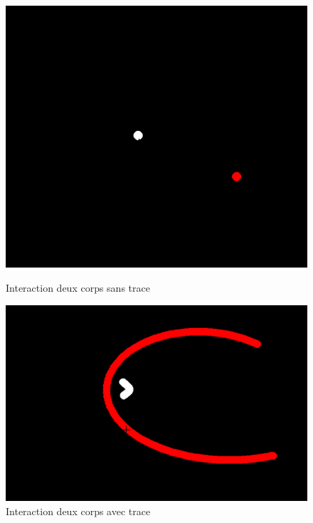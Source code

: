 \documentclass[a4paper, 12pt]{article}
\begin{document}
	\begin{figure}[H]
    	\centering
        \begin{minipage}{0.15\linewidth}
        	\centering
        	\includegraphics[width=\linewidth]{img/couverture.png}
        	\caption{\label{fig:DeuxCorps1} Interaction deux corps sans trace}
    	\end{minipage}
        \hspace{0.05\linewidth}  %
    	\begin{minipage}{0.2\linewidth}
        	\centering
        	\includegraphics[width=\linewidth]{img/interactionDeuxCorps.png}
        	\caption{\label{fig:DeuxCorps2} Interaction deux corps avec trace}

\end{minipage}
\end{figure}
\end{document}
